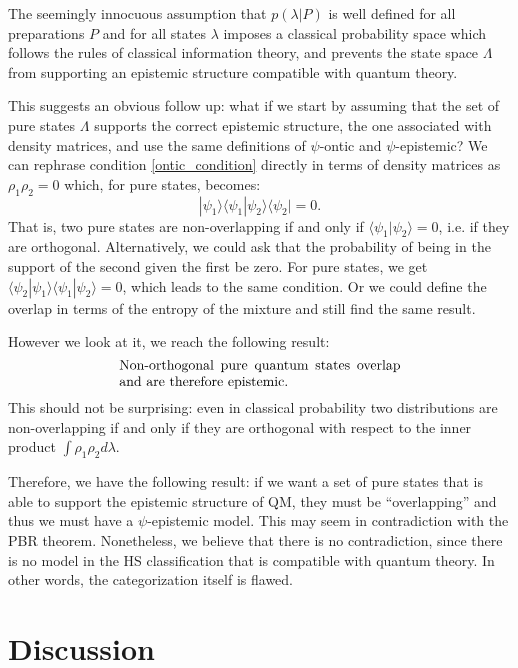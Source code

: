\documentclass[twocolumn,prl,floatfix,superscriptaddress]{revtex4-2}
\begin{document}
The seemingly innocuous assumption that $p(\lambda|P)$ is well defined for all preparations $P$ and for all states $\lambda$ imposes a classical probability space which follows the rules of classical information theory, and prevents the state space $\Lambda$ from supporting an epistemic structure compatible with quantum theory. 

This suggests an obvious follow up: what if we start by assuming that the set of pure states $\Lambda$ supports the correct epistemic structure, the one associated with density matrices, and use the same definitions of $\psi$-ontic and $\psi$-epistemic? We can rephrase condition \ref{ontic_condition} directly in terms of density matrices as $\rho_1 \rho_2 = 0$ which, for pure states, becomes:
\begin{equation}
	|\psi_1\rangle\langle\psi_1|\psi_2\rangle\langle\psi_2| = 0.
\end{equation}
That is, two pure states are non-overlapping if and only if $\langle\psi_1|\psi_2\rangle=0$, i.e. if they are orthogonal. Alternatively, we could ask that the probability of being in the support of the second given the first be zero. For pure states, we get $\langle\psi_2|\psi_1\rangle\langle\psi_1|\psi_2\rangle = 0$, which leads to the same condition. Or we could define the overlap in terms of the entropy of the mixture and still find the same result.

However we look at it, we reach the following result:
\begin{align}\label{conclusion}
	\parbox{2.8in}{Non-orthogonal pure quantum states overlap and are therefore epistemic.}
\end{align}
This should not be surprising: even in classical probability two distributions are non-overlapping if and only if they are orthogonal with respect to the inner product $\int \rho_1 \rho_2 d\lambda$.

Therefore, we have the following result: if we want a set of pure states that is able to support the epistemic structure of QM, they must be ``overlapping'' and thus we must have a $\psi$-epistemic model. This may seem in contradiction with the PBR theorem. Nonetheless, we believe that there is no contradiction, since there is no model in the HS classification that is compatible with quantum theory. In other words, the categorization itself is flawed.

\section{Discussion}
\end{document}
